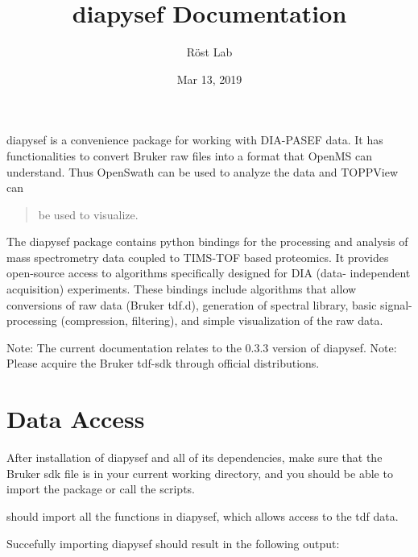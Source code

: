 \documentclass[letterpaper,10pt,english]{sphinxmanual}
\title{diapysef Documentation}
\date{Mar 13, 2019}
\author{Röst Lab}
\begin{document}
\pagestyle{empty}
\sphinxmaketitle
\pagestyle{plain}
\sphinxtableofcontents
\pagestyle{normal}
\label{\detokenize{index::doc}}


diapysef is a convenience package for working with DIA-PASEF data. It has
functionalities to convert Bruker raw files into a format that OpenMS can
understand. Thus OpenSwath can be used to analyze the data and TOPPView can
\begin{quote}

be used to visualize.
\end{quote}

The diapysef package contains python bindings for the processing and analysis
of mass spectrometry data coupled to TIMS-TOF based proteomics. It provides
open-source access to algorithms specifically designed for DIA (data-
independent acquisition) experiments. These bindings include algorithms that
allow conversions of raw data (Bruker tdf.d), generation of spectral library,
basic signal-processing (compression, filtering), and simple visualization
of the raw data.

Note: The current documentation relates to the 0.3.3 version of diapysef.
Note: Please acquire the Bruker tdf-sdk through official distributions.


\chapter{Data Access}
\label{\detokenize{convenientfunctions:data-access}}\label{\detokenize{convenientfunctions::doc}}
After installation of diapysef and all of its dependencies, make sure that the
Bruker sdk file is in your current working directory, and you should be able
to import the package or call the scripts.

\begin{sphinxVerbatim}[commandchars=\\\{\}]
 
\end{sphinxVerbatim}

should import all the functions in diapysef, which allows access to the tdf data.

Succefully importing diapysef should result in the following output:

\begin{sphinxVerbatim}[commandchars=\\\{\}]
         
\end{sphinxVerbatim}
\end{document}
